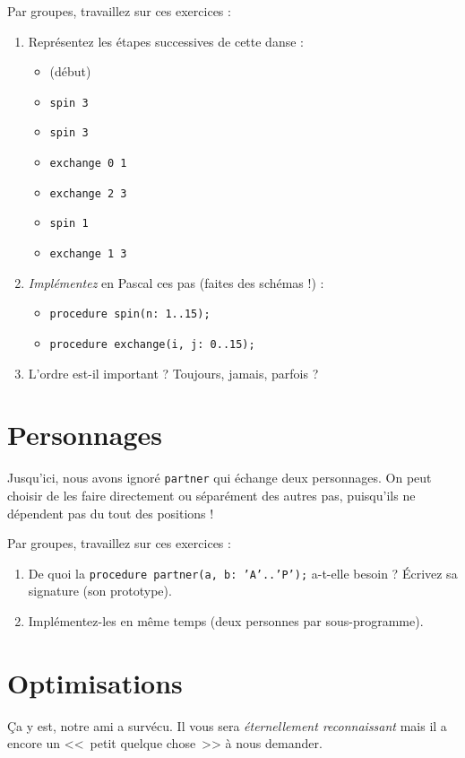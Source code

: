 \documentclass[11pt,a4paper,oneside]{article}
\begin{document}
Par groupes, travaillez sur ces exercices :
\begin{enumerate}
\item Représentez les étapes successives de cette danse :
	\begin{itemize}
	\item (début)
	\item \texttt{spin 3}
	\item \texttt{spin 3}
	\item \texttt{exchange 0 1}
	\item \texttt{exchange 2 3}
	\item \texttt{spin 1}
	\item \texttt{exchange 1 3}
	\end{itemize}
\item \emph{Implémentez} en Pascal ces pas (faites des schémas !) :
	\begin{itemize}
	\item \texttt{procedure spin(n: 1..15);}
	\item \texttt{procedure exchange(i, j: 0..15);}
	\end{itemize}
\item L'ordre est-il important ? Toujours, jamais, parfois ?
\end{enumerate}

\section{Personnages}
Jusqu'ici, nous avons ignoré \texttt{partner} qui échange deux personnages. On
peut choisir de les faire directement ou séparément des autres pas, puisqu'ils
ne dépendent pas du tout des positions !

Par groupes, travaillez sur ces exercices :
\begin{enumerate}
\item De quoi la \texttt{procedure partner(a, b: 'A'..'P');} a-t-elle besoin ?
	Écrivez sa signature (son prototype).
\item Implémentez-les en même temps (deux personnes par sous-programme).
\end{enumerate}

\section{Optimisations}
Ça y est, notre ami a survécu. Il vous sera \emph{éternellement reconnaissant}
mais il a encore un <<~petit quelque chose~>> à nous demander.
\end{document}
